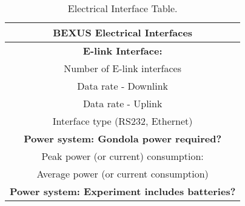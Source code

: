 
\begin{table}[H]
\centering
\begin{tabular}{|c|c|c|}
\hline
\multicolumn{3}{|c|}{\textbf{BEXUS Electrical Interfaces}}                     \\ \hline
\multicolumn{3}{|c|}{\textbf{E-link Interface: }}                           \\ \hline
\multirow{4}{*}{}    & Number of E-link interfaces               &            \\ \cline{2-3} 
                     & Data rate - Downlink                      &      \\ \cline{2-3} 
                     & Data rate - Uplink                        &       \\ \cline{2-3} 
                     & Interface type (RS232, Ethernet)          &     \\ \hline
\multicolumn{3}{|c|}{\textbf{Power system: Gondola power required? }}       \\ \hline
\multirow{2}{*}{}    & Peak power (or current) consumption:      &             \\ \cline{2-3} 
                     & Average power (or current consumption)    &             \\ \hline
\multicolumn{3}{|l|}{\textbf{Power system: Experiment includes batteries? }} \\ \hline
\end{tabular}
\caption{Electrical Interface Table.}
\label{tab:electrical-interface-table}
\end{table}
\raggedbottom